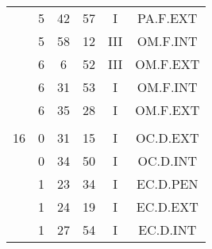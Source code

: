 \documentclass[12pt, a4paper]{article}
\begin{document}
\begin{multicols}{3}
{\begin{tabular}{c c c c c c}
	 	 	 	 & 5 & 42 & 57 & I & PA.F.EXT\\%
	 	 	 	 & 5 & 58 & 12 & III & OM.F.INT\\%
	 	 	 	 & 6 & 6 & 52 & III & OM.F.EXT\\%
	 	 	 	 & 6 & 31 & 53 & I & OM.F.INT\\%
	 	 	 	 & 6 & 35 & 28 & I & OM.F.EXT\\%
	 	 	 	 & & & & & \\%
	 	 	 	16 & 0 & 31 & 15 & I & OC.D.EXT\\%
	 	 	 	 & 0 & 34 & 50 & I & OC.D.INT\\%
	 	 	 	 & 1 & 23 & 34 & I & EC.D.PEN\\%
	 	 	 	 & 1 & 24 & 19 & I & EC.D.EXT\\%
	 	 	 	 & 1 & 27 & 54 & I & EC.D.INT\\%
	 	 \end{tabular}
 	}
\end{multicols}
\end{document}
